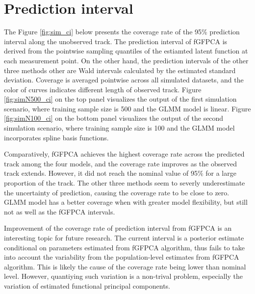 \documentclass[12pt]{article}
\begin{document}



\newpage

\renewcommand{\thesection}{Supplement \Roman{section}:}
\renewcommand{\thefigure}{S.\arabic{figure}}
\setcounter{section}{0}
\setcounter{figure}{0}
\section{Prediction interval}

The Figure \ref{fig:sim_ci} below presents the coverage rate of the 95\% prediction interval along the unobserved track. The prediction interval of fGFPCA is derived from the pointwise sampling quantiles of the estiamted latent function at each measurement point. On the other hand, the prediction intervals of the other three methods other are Wald intervals calculated by the estimated standard deviation. Coverage is averaged pointwise across all simulated datasets, and the color of curves indicates different length of observed track. Figure \ref{fig:simN500_ci} on the top panel visualizes the output of the first simulation scenario, where training sample size is 500 and the GLMM model is linear. Figure \ref{fig:simN100_ci} on the bottom panel visualizes the output of the second simulation scenario, where training sample size is 100 and the GLMM model incorporates spline basis functions.

Comparatively, fGFPCA achieves the highest coverage rate across the predicted track among the four models, and the coverage rate improves as the observed track extends. However, it did not reach the nominal value of 95\% for a large proportion of the track. The other three methods seem to severly underestimate the uncertainty of prediction, causing the coverage rate to be close to zero. GLMM model has a better coverage when with greater model flexibility, but still not as well as the fGFPCA intervals. 

Improvement of the coverage rate of prediction interval from fGFPCA is an interesting topic for future research. The current interval is a posterior estimate conditional on parameters estimated from fGFPCA algorithm, thus fails to take into account the variability from the population-level estimates from fGFPCA algorithm. This is likely the cause of the coverage rate being lower than nominal level. However, quantiying such variation is a non-trival problem, especially the variation of estimated functional principal components. 
\end{document}
